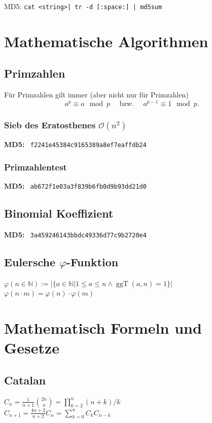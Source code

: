 \documentclass[10pt,a4paper,ngerman,oneside,]{article}
\newcommand{\N}{\ensuremath{\mathbb{N}}}
\newcommand{\ggT}{\ensuremath{\operatorname{ggT}}}
\begin{document}
\begin{multicols}{2}
\thispagestyle{fancy}
\tableofcontents
\vfill
\newcommand{\hash}[1]{{\bfseries MD5:} ~\texttt{#1}}
\vspace{3em}\noindent MD5: \texttt{cat <string>| tr -d [:space:] | md5sum}
\newpage

\section{Mathematische Algorithmen}
\subsection{Primzahlen}
Für Primzahlen gilt immer (aber nicht nur für Primzahlen)
\[a^p\equiv a\mod p \quad\text{ bzw. }\quad a^{p-1}\equiv 1 \mod p.\]
\subsubsection{Sieb des Eratosthenes $\mathcal O(n^2)$}
\hash{f2241e45384c9165389a8ef7eaffdb24}
\subsubsection{Primzahlentest}
\hash{ab672f1e03a3f839b6fb0d9b93dd21d0}
\subsection{Binomial Koeffizient}
\hash{3a459246143bbdc49336d77c9b2720e4}
\subsection{Eulersche $\varphi$-Funktion}
$\varphi(n\in\N):=|\{a\in\N |1\leq a \leq n \wedge \ggT (a,n)=1\}|$\\
$\varphi(n\cdot m)=\varphi(n)\cdot\varphi(m)$

\section{Mathematisch Formeln und Gesetze}
\subsection{Catalan}
$C_n = \frac1{n+1}\binom{2n}{n}=\prod_{k=2}^n (n+k)/k$\\
$C_{n+1} = \frac{4n+2}{n+2}C_n=\sum_{k=0}^{n}C_kC_{n-k}$

\end{multicols}
\end{document}
